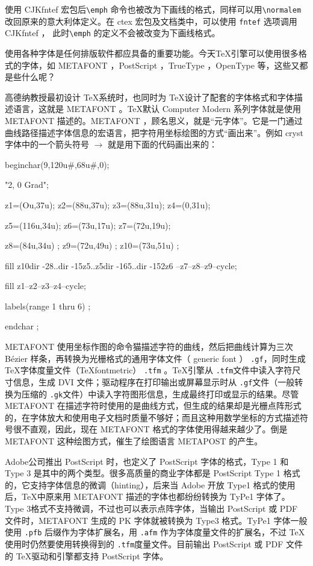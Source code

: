 使用 CJKfntef 宏包后\verb|\emph| 命令也被改为下画线的格式，同样可以用\verb|\normalem| 改回原来的意大利体定义。在 ctex 宏包及文档类中，可以使用 \verb|fntef| 选项调用 CJKfntef ，
此时\verb|\emph| 的定义不会被改变为下画线格式。

{
    \qquad 使用各种字体是任何排版软件都应具备的重要功能。今天\TeX 引擎可以使用很多格式的字体，如 METAFONT ，PostScript ，TrueType ，OpenType 等，这些又都是些什么呢？

    \qquad 高德纳教授最初设计 \TeX 系统时，也同时为 \TeX 设计了配套的字体格式和字体描述语言，这就是 METAFONT 。\TeX 默认 Computer Modern 系列字体就是使用 METAFONT 描述的。METAFONT ，顾名思义，就是“元字体”。它是一门通过曲线路径描述字体信息的宏语言，把字符用坐标绘图的方式“画出来”。例如 cryst 字体中的一个箭头符号 $\to$ 就是用下面的代码画出来的：

    {\ttfamily
\qquad beginchar(9,120u\#,68u\#,0);

\qquad "2, 0 Grad";

\qquad z1=(Ou,37u); z2=(88u,37u); z3=(88u,31u); z4=(0,31u);

\qquad z5=(116u,34u); z6=(73u,17u); z7=(72u,19u);

\qquad z8=(84u,34u) ; z9=(72u,49u) ; z10=(73u,51u) ;

\qquad fill z10{dir -28}..{dir -15}z5..z5{dir -165}..{dir -152}z6
--z7--z8--z9--cycle;

\qquad fill z1--z2--z3--z4--cycle;

\qquad labels(range 1 thru 6) ;

\qquad endchar ;}

\qquad METAFONT 使用坐标作图的命令猫描述字符的曲线，然后把曲线计算为三次 Bézier 样条，再转换为光栅格式的通用字体文件（ generic font ） \lstinline{.gf}，同时生成\TeX 字体度量文件（TeXfontmetric） \lstinline{.tfm} 。\TeX 引擎从 \lstinline{.tfm}文件中读入字符尺寸信息，生成 DVI 文件；驱动程序在打印输出或屏幕显示时从 \lstinline{.gf}文件（一般转换为压缩的 \lstinline{.gk}文件）中读入字符图形信息，生成最终打印或显示的结果。尽管 METAFONT 在描述字符时使用的是曲线方式，但生成的结果却是光栅点阵形式的，在字体放大和使用电子文档时质量不够好；而且这种用数学坐标的方式描述符号很不直观，因此，现在 METAFONT 格式的字体使用得越来越少了。倒是 METAFONT 这种绘图方式，催生了绘图语言 METAPOST 的产生。

\qquad Adobe公司推出 PostScript 时，也定义了 PostScript 字体的格式，Type 1 和 Type 3 是其中的两个类型。很多高质量的商业字体都是 PostScript Type 1 格式的，它支持字体信息的微调（hinting），后来当 Adobe 开放 Type1 格式的使用后，\TeX 中原来用 METAFONT 描述的字体也都纷纷转换为 TyPe1 字体了。Type 3格式不支持微调，不过也可以表示点阵字体，当输出 PostScript 或
PDF 文件时，METAFONT 生成的 PK 字体就被转换为 Type3 格式。TyPe1 字体一般使用 \lstinline{.pfb} 后缀作为字体扩展名，用 \lstinline{.afm} 作为字体度量文件的扩展名，不过 \TeX 使用时仍然要使用转换得到的 \lstinline{.tfm}度量文件。目前输出 PostScript 或 PDF 文件的 \TeX 驱动和引擎都支持 PostScript 字体。

}
